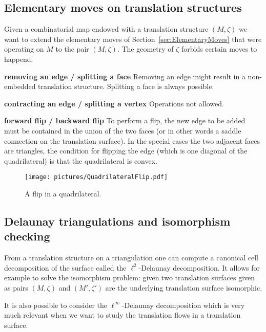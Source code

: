 \documentclass[a4paper,12pt]{article}
\newcommand{\commv}[1]{{\color{red!50!gray}{#1}}}
\begin{document}
\subsection{Elementary moves on translation structures}
Given a combinatorial map endowed with a translation structure $(M, \zeta)$
we want to extend the elementary moves of Section~\ref{sec:ElementaryMoves}
that were operating on $M$ to the pair $(M, \zeta)$. The geometry of $\zeta$
forbids certain moves to happend.

\textbf{removing an edge / splitting a face}
Removing an edge might result in a non-embedded translation structure.
Splitting a face is always possible.

\textbf{contracting an edge / splitting a vertex}
Operations not allowed.

\textbf{forward flip / backward flip}
To perform a flip, the new edge to be added must be contained in the union of
the two faces (or in other words a saddle connection on the translation surface).
In the special cases the two adjacent faces are triangles, the condition
for flipping the edge (which is one diagonal of the quadrilateral) is that the
quadrilateral is convex.
\begin{figure}[!ht]
\begin{center}\texttt{[image: pictures/QuadrilateralFlip.pdf]}\end{center}
\caption{A flip in a quadrilateral.}
\end{figure}

\subsection{Delaunay triangulations and isomorphism checking}
From a translation structure on a triangulation one can compute a canonical
cell decomposition of the surface called the $\ell^2$-Delaunay decomposition.
It allows for example to solve the isomorphism problem: given two
translation surfaces given as pairs $(M,\zeta)$ and $(M',\zeta')$ are
the underlying translation surface isomorphic.

It is also possible to consider the $\ell^\infty$-Delaunay decomposition
which is very much relevant when we want to study the translation flows
in a translation surface.

\commv{These are (simple enough) but essential algorithm.
\begin{enumerate}
\item TODO: implement $\ell^2$-Delaunay, isomorphism checking and isometry group,
\item TODO: implement $\ell^\infty$-Delaunay.
\end{enumerate}}
\end{document}
